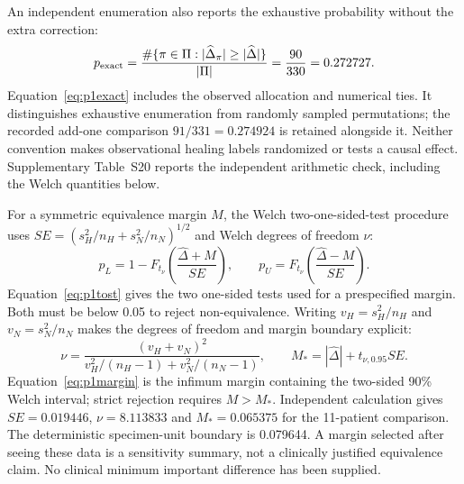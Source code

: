 \documentclass[10pt,a4paper]{article}
\begin{document}
An independent enumeration also reports the exhaustive probability without the extra correction:
\begin{equation}
p_{\rm exact}=\frac{\#\{\pi\in\Pi:|\widehat\Delta_\pi|\geq|\widehat\Delta|\}}{|\Pi|}=\frac{90}{330}=0.272727.\label{eq:p1exact}
\end{equation}
Equation~\eqref{eq:p1exact} includes the observed allocation and numerical ties. It distinguishes exhaustive enumeration from randomly sampled permutations; the recorded add-one comparison $91/331=0.274924$ is retained alongside it. Neither convention makes observational healing labels randomized or tests a causal effect. Supplementary Table~S20 reports the independent arithmetic check, including the Welch quantities below.

For a symmetric equivalence margin $M$, the Welch two-one-sided-test procedure uses $SE=(s_H^2/n_H+s_N^2/n_N)^{1/2}$ and Welch degrees of freedom $\nu$:
\begin{equation}
p_L=1-F_{t_\nu}\!\left(\frac{\widehat\Delta+M}{SE}\right),\qquad
p_U=F_{t_\nu}\!\left(\frac{\widehat\Delta-M}{SE}\right).\label{eq:p1tost}
\end{equation}
Equation~\eqref{eq:p1tost} gives the two one-sided tests used for a prespecified margin. Both must be below 0.05 to reject non-equivalence. Writing $v_H=s_H^2/n_H$ and $v_N=s_N^2/n_N$ makes the degrees of freedom and margin boundary explicit:
\begin{equation}
\nu=\frac{(v_H+v_N)^2}{v_H^2/(n_H-1)+v_N^2/(n_N-1)},\qquad
M_*=|\widehat\Delta|+t_{\nu,0.95}SE.\label{eq:p1margin}
\end{equation}
Equation~\eqref{eq:p1margin} is the infimum margin containing the two-sided 90\% Welch interval; strict rejection requires $M>M_*$. Independent calculation gives $SE=0.019446$, $\nu=8.113833$ and $M_*=0.065375$ for the 11-patient comparison. The deterministic specimen-unit boundary is 0.079644. A margin selected after seeing these data is a sensitivity summary, not a clinically justified equivalence claim. No clinical minimum important difference has been supplied.
\end{document}
